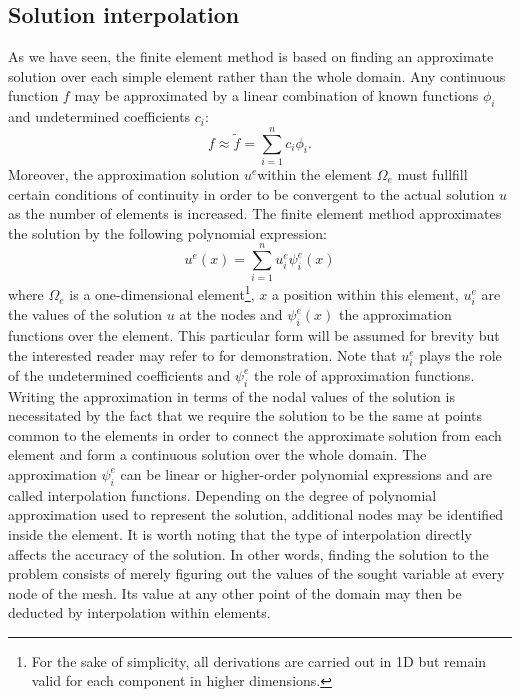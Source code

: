 	
	\subsection{Solution interpolation}	\label{chap3:solutionInterpolation}
As we have seen, the finite element method is based on finding an approximate solution over each simple element rather than the whole domain. Any continuous function $ f $ may be approximated by a linear combination of known functions $ \phi_i $ and undetermined coefficients $ c_i $:
\begin{equation}
f \approx \tilde{f} = \sum_{i=1}^n c_i \phi_i .
\end{equation}
Moreover, the approximation solution $ u^e $within the element $\Omega_e $ must fullfill certain conditions of continuity in order to be convergent to the actual solution $ u $ as the number of elements is increased. The finite element method approximates the solution by the following polynomial expression:
\begin{equation}
\label{chap3:polynom}
u^e(x) = \sum_{i=1}^n u^e_i \psi^e_i(x) 
\end{equation}
where $ \Omega_e $ is a one-dimensional element\footnote{For the sake of simplicity, all derivations are carried out in 1D but remain valid for each component in higher dimensions.}, $ x $ a position within this element, $ u^e_i $ are the values of the solution $ u $ at the nodes and $ \psi^e_i(x) $ the approximation functions over the element. This particular form will be assumed for brevity but the interested reader may refer to \cite{Reddy93} for demonstration. Note that $ u^e_i  $ plays the role of the undetermined coefficients and $ \psi^e_i $ the role of approximation functions. Writing the approximation in terms of the nodal values of the solution is necessitated by the fact that we require the solution to be the same at points common to the elements in order to connect the approximate solution from each element and form a continuous solution over the whole domain. The approximation $ \psi^e_i $ can be linear or higher-order polynomial expressions and are called interpolation functions. 
Depending on the degree of polynomial approximation used to represent the solution, additional nodes may be identified inside the element. It is worth noting that the type of interpolation directly affects the accuracy of the solution. In other words, finding the solution to the problem consists of merely figuring out the values of the sought variable at every node of the mesh. Its value at any other point of the domain may then be deducted by interpolation within elements. 


